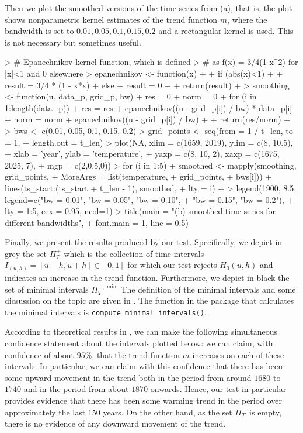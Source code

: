\documentclass[a4paper]{scrartcl}
\begin{document}
Then we plot the smoothed versions of the time series from (a), that is, the plot shows nonparametric kernel estimates of the trend function $m$, where the bandwidth is set to $0.01, 0.05, 0.1, 0.15, 0.2$ and a rectangular kernel is used. This is not necessary but sometimes useful.
\begin{Schunk}
\begin{Sinput}
> # Epanechnikov kernel function, which is defined
> # as f(x) = 3/4(1-x^2) for |x|<1 and 0 elsewhere
> epanechnikov <- function(x)
+ {
+   if (abs(x)<1)
+   {
+     result = 3/4 * (1 - x*x)
+   } else {
+     result = 0
+   }
+   return(result)
+ }
> smoothing <- function(u, data_p, grid_p, bw){
+   res = 0
+   norm = 0
+   for (i in 1:length(data_p)){
+     res = res + epanechnikov((u - grid_p[i]) / bw) * data_p[i]
+     norm = norm + epanechnikov((u - grid_p[i]) / bw)
+   }
+   return(res/norm)
+ }
> bws <- c(0.01, 0.05, 0.1, 0.15, 0.2)
> grid_points <- seq(from = 1 / t_len, to = 1,
+                    length.out = t_len)
> plot(NA, xlim = c(1659, 2019), ylim = c(8, 10.5),
+      xlab = 'year', ylab = 'temperature',
+      yaxp  = c(8, 10, 2), xaxp = c(1675, 2025, 7),
+      mgp = c(2,0.5,0))
> for (i in 1:5){
+     smoothed <- mapply(smoothing, grid_points,
+                        MoreArgs = list(temperature,
+                                        grid_points,
+                                        bws[i]))
+     lines(ts_start:(ts_start + t_len - 1), smoothed,
+           lty = i)
+   }
> legend(1900, 8.5, legend=c("bw = 0.01", "bw = 0.05", "bw = 0.10",
+                            "bw = 0.15", "bw = 0.2"),
+        lty = 1:5, cex = 0.95, ncol=1)
> title(main = "(b) smoothed time series for different bandwidths",
+       font.main = 1, line = 0.5)
\end{Sinput}
\end{Schunk}

Finally, we present the results produced by our test. Specifically, we depict in grey the set $\Pi^{+}_T$ which is the collection of time intervals $I_{(u,h)} = [u - h, u + h] \in [0, 1]$ for which our test rejects $H_0(u,h)$ and indicates an increase in the trend function. Furthermore, we depict in black the set of minimal intervals $\Pi^{+, \min}_T$ The definition of the minimal intervals and some dicsussion on the topic are given in \cite{KhismatullinaVogt2020}. The function in the package that calculates the minimal intervals is \verb|compute_minimal_intervals()|.


According to theoretical results in \cite{KhismatullinaVogt2020}, we can make the following simultaneous confidence statement about the intervals plotted below: we can claim, with confidence of about $95\%$, that the trend function $m$ increases on each of these intervals. In particular, we can claim with this confidence that there has been some upward movement in the trend both in the period from around $1680$ to $1740$ and in the period from about $1870$ onwards. Hence, our test in particular provides evidence that there has been some warming trend in the period over approximately the last $150$ years. On the other hand, as the set $\Pi_T^-$ is empty, there is no evidence of any downward movement of the trend.
\end{document}
